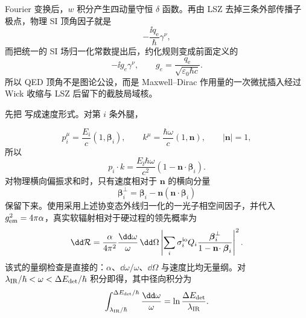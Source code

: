\begin{derivation}[高斯平均中的传播子与顶角规则]
Fourier 变换后，$w$ 积分产生四动量守恒 \(\delta\) 函数。再由 LSZ 去掉三条外部传播子极点，物理 SI 顶角因子就是
\begin{equation*}
 -\frac{\ii q_{\mathrm e}}{\hbar}\gamma^\nu,
 \end{equation*}
而把统一的 SI 场归一化常数提出后，约化规则变成前面定义的
\begin{equation*}
 {-\ii g_e\gamma^\nu,\qquad
 g_e=\frac{q_{\mathrm e}}{\sqrt{\varepsilon_0\hbar c}}.}
 \end{equation*}
所以 QED 顶角不是图论公设，而是 Maxwell--Dirac 作用量的一次微扰插入经过 Wick 收缩与 LSZ 后留下的截肢局域核。
\end{derivation}




\begin{derivation}[软光子因子的角分布]
先把 写成速度形式。对第 $i$ 条外腿，

\begin{equation*}
 p_i^\mu=\frac{E_i}{c}(1,\boldsymbol\beta_i),
 \qquad
 k^\mu=\frac{\hbar\omega}{c}(1,\mathbf n),
 \qquad
 |\mathbf n|=1,
\end{equation*}
所以
\begin{equation*}
 p_i\!\cdot k
 =\frac{E_\ii\hbar\omega}{c^2}
 (1-\mathbf n\!\cdot\boldsymbol\beta_i).
\end{equation*}
对物理横向偏振求和时，只有速度相对于 $\mathbf n$ 的横向分量
\begin{equation*}
 \boldsymbol\beta_i^\perp
 =\boldsymbol\beta_i-\mathbf n(\mathbf n\!\cdot\boldsymbol\beta_i)
\end{equation*}
保留下来。使用采用上述协变态外线归一化的一光子相空间因子，并代入 $g_{\rm em}^2=4\pi\alpha$，真实软辐射相对于硬过程的领先概率为
\begin{equation*}
 \dd\mathcal R
 =\frac{\alpha}{4\pi^2}
 \frac{\dd\omega}{\omega}\,\dd\Omega
 \left|
 \sum_i\sigma_i^{\rm io}Q_i
 \frac{\boldsymbol\beta_i^\perp}
 {1-\mathbf n\!\cdot\boldsymbol\beta_i}
 \right|^2.
\end{equation*}
该式的量纲检查是直接的：$\alpha$、$\dd\omega/\omega$、$\dd\Omega$ 与速度比均无量纲。对
$\lambda_{\rm IR}/\hbar<\omega<\Delta E_{\rm det}/\hbar$ 积分即得，其中径向积分为
\begin{equation*}
 \int_{\lambda_{\rm IR}/\hbar}^{\Delta E_{\rm det}/\hbar}
 \frac{\dd\omega}{\omega}
 =\ln\frac{\Delta E_{\rm det}}{\lambda_{\rm IR}}.
\end{equation*}
\end{derivation}

